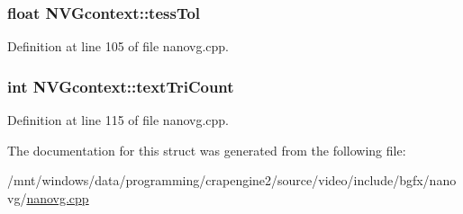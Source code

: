 \hypertarget{struct_n_v_gcontext_a12879e67beadb4dfd5dbd43aa8b87de9}{
\subsubsection[{tess\+Tol}]{\setlength{\rightskip}{0pt plus 5cm}float N\+V\+Gcontext\+::tess\+Tol}}\label{struct_n_v_gcontext_a12879e67beadb4dfd5dbd43aa8b87de9}


Definition at line 105 of file nanovg.\+cpp.

\hypertarget{struct_n_v_gcontext_ae02585c93bfdeab6edd75d4777480ed1}{
\subsubsection[{text\+Tri\+Count}]{\setlength{\rightskip}{0pt plus 5cm}int N\+V\+Gcontext\+::text\+Tri\+Count}}\label{struct_n_v_gcontext_ae02585c93bfdeab6edd75d4777480ed1}


Definition at line 115 of file nanovg.\+cpp.



The documentation for this struct was generated from the following file\+:\begin{DoxyCompactItemize}
\item 
/mnt/windows/data/programming/crapengine2/source/video/include/bgfx/nanovg/\hyperlink{nanovg_8cpp}{nanovg.\+cpp}\end{DoxyCompactItemize}
